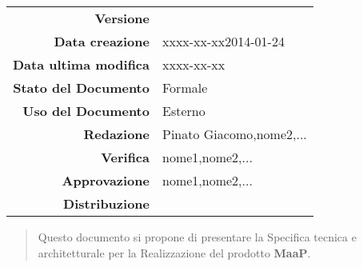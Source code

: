 


\newcommand{\Versione}{\versioneSpecificaTecnica{}}	  %
\newcommand{\Data}{xxxx-xx-xx}				           %
\newcommand{\DataUltimaModifica}{xxxx-xx-xx}
\newcommand{\TipoDocumento}{Specifica Tecnica}	       %



\begin{center}
\begin{tabular}{r|l}
\textbf{Versione} & \Versione{} \\
\textbf{Data creazione} & \Data{2014-01-24} \\
\textbf{Data ultima modifica} & \DataUltimaModifica{} \\
\textbf{Stato del Documento} & Formale \\		          %
\textbf{Uso del Documento} & Esterno \\			          %
\textbf{Redazione} &  Pinato Giacomo,nome2,...\\		        %
\textbf{Verifica} & nome1,nome2,...\\			        %
\textbf{Approvazione} & nome1,nome2,...\\				 %
\textbf{Distribuzione} & \parbox[t]{4cm}{\NomeGruppo{}}\\
\end{tabular}
\end{center}

\vspace{0.05in}

\begin{abstract}
\begin{center}
Questo documento si propone di presentare la Specifica tecnica e architetturale per la Realizzazione del prodotto \textbf{MaaP}.
\end{center}
\end{abstract}

